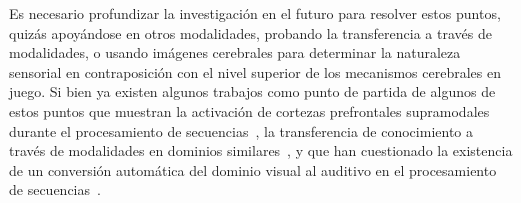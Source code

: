 Es necesario profundizar la investigación en el futuro para resolver estos puntos, quizás apoyándose en otros modalidades, probando la transferencia a través de modalidades, o usando imágenes cerebrales para determinar la naturaleza sensorial en contraposición con el nivel superior de los mecanismos cerebrales en juego. Si bien ya existen algunos trabajos como punto de partida de algunos de estos puntos que muestran la activación de cortezas prefrontales supramodales durante el procesamiento de secuencias~\cite{f19,f60}, la transferencia de conocimiento a través de modalidades en dominios similares~\cite{yildirim2015learning}, y que han cuestionado la existencia de un conversión automática del dominio visual al auditivo en el procesamiento de secuencias~\cite{f121}.


